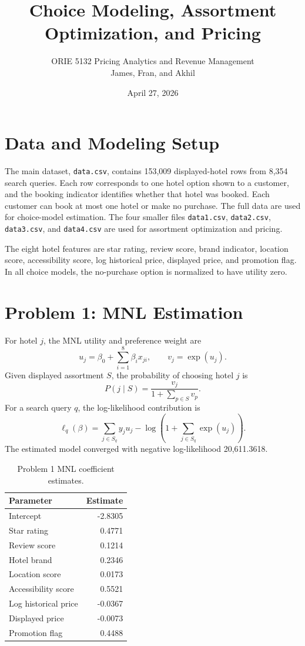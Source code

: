 \documentclass[11pt]{article}
\title{Choice Modeling, Assortment Optimization, and Pricing}
\author{ORIE 5132 Pricing Analytics and Revenue Management\\James, Fran, and Akhil}
\date{April 27, 2026}
\begin{document}
\maketitle

\section{Data and Modeling Setup}

The main dataset, \texttt{data.csv}, contains 153,009 displayed-hotel rows from 8,354 search queries. Each row corresponds to one hotel option shown to a customer, and the booking indicator identifies whether that hotel was booked. Each customer can book at most one hotel or make no purchase. The full data are used for choice-model estimation. The four smaller files \texttt{data1.csv}, \texttt{data2.csv}, \texttt{data3.csv}, and \texttt{data4.csv} are used for assortment optimization and pricing.

The eight hotel features are star rating, review score, brand indicator, location score, accessibility score, log historical price, displayed price, and promotion flag. In all choice models, the no-purchase option is normalized to have utility zero.

\section{Problem 1: MNL Estimation}

For hotel $j$, the MNL utility and preference weight are
\[
u_j = \beta_0 + \sum_{i=1}^8 \beta_i x_{ji},
\qquad
v_j = \exp(u_j).
\]
Given displayed assortment $S$, the probability of choosing hotel $j$ is
\[
P(j \mid S) = \frac{v_j}{1 + \sum_{p \in S} v_p}.
\]
For a search query $q$, the log-likelihood contribution is
\[
\ell_q(\beta)
= \sum_{j \in S_q} y_j u_j
- \log\left(1 + \sum_{j \in S_q} \exp(u_j)\right).
\]
The estimated model converged with negative log-likelihood 20,611.3618.

\begin{table}[H]
\centering
\caption{Problem 1 MNL coefficient estimates.}
\begin{tabular}{lr}
\toprule
Parameter & Estimate \\
\midrule
Intercept & -2.8305 \\
Star rating & 0.4771 \\
Review score & 0.1214 \\
Hotel brand & 0.2346 \\
Location score & 0.0173 \\
Accessibility score & 0.5521 \\
Log historical price & -0.0367 \\
Displayed price & -0.0073 \\
Promotion flag & 0.4488 \\
\bottomrule
\end{tabular}
\end{table}
\end{document}

